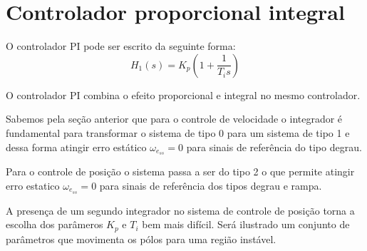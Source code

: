 \documentclass[10pt]{article}
\theoremstyle{plain}
\begin{document}
\section{Controlador proporcional integral}

O controlador PI pode ser escrito da seguinte forma:
\begin{equation}
H_1(s) = K_p \left(1+\frac{1}{T_is} \right)
\end{equation}

O controlador PI combina o efeito proporcional e integral no mesmo controlador.

Sabemos pela seção anterior que para o controle de velocidade o integrador é fundamental
para transformar o sistema de tipo 0 para um sistema de tipo 1 e dessa forma
atingir erro estático $\omega_{e_{ss}}=0$ para sinais de referência do tipo degrau.

Para o controle de posição o sistema passa a ser do tipo 2 o que permite atingir erro 
estatico $\omega_{e_{ss}}=0$ para sinais de referência dos tipos degrau e rampa.

A presença de um segundo integrador no sistema de controle de posição torna a escolha
dos parâmeros $K_p$ e $T_i$ bem mais difícil.
Será ilustrado um conjunto de parâmetros que movimenta os pólos para uma região instável.
\end{document}
